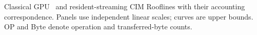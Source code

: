 \begin{paperfigure}

\caption{Classical GPU~\cite{williams2009roofline} and resident-streaming CIM Rooflines with their accounting correspondence. Panels use independent linear scales; curves are upper bounds. OP and Byte denote operation and transferred-byte counts.}
\label{fig:roofline-comparison}
\end{paperfigure}
